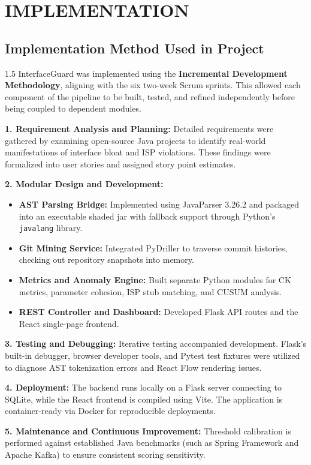 \documentclass[12pt,a4paper]{article}
\begin{document}
\clearpage

\section{IMPLEMENTATION}

\subsection{Implementation Method Used in Project}
\begin{spacing}{1.5}
\justifying
InterfaceGuard was implemented using the \textbf{Incremental Development Methodology}, aligning with the six two-week Scrum sprints. This allowed each component of the pipeline to be built, tested, and refined independently before being coupled to dependent modules.

\textbf{1. Requirement Analysis and Planning:} Detailed requirements were gathered by examining open-source Java projects to identify real-world manifestations of interface bloat and ISP violations. These findings were formalized into user stories and assigned story point estimates.

\textbf{2. Modular Design and Development:}
\begin{itemize}[leftmargin=*,itemsep=2pt]
  \item \textbf{AST Parsing Bridge:} Implemented using JavaParser 3.26.2 and packaged into an executable shaded jar with fallback support through Python's \texttt{javalang} library.
  \item \textbf{Git Mining Service:} Integrated PyDriller to traverse commit histories, checking out repository snapshots into memory.
  \item \textbf{Metrics and Anomaly Engine:} Built separate Python modules for CK metrics, parameter cohesion, ISP stub matching, and CUSUM analysis.
  \item \textbf{REST Controller and Dashboard:} Developed Flask API routes and the React single-page frontend.
\end{itemize}

\textbf{3. Testing and Debugging:} Iterative testing accompanied development. Flask's built-in debugger, browser developer tools, and Pytest test fixtures were utilized to diagnose AST tokenization errors and React Flow rendering issues.

\textbf{4. Deployment:} The backend runs locally on a Flask server connecting to SQLite, while the React frontend is compiled using Vite. The application is container-ready via Docker for reproducible deployments.

\textbf{5. Maintenance and Continuous Improvement:} Threshold calibration is performed against established Java benchmarks (such as Spring Framework and Apache Kafka) to ensure consistent scoring sensitivity.
\end{spacing}
\end{document}
